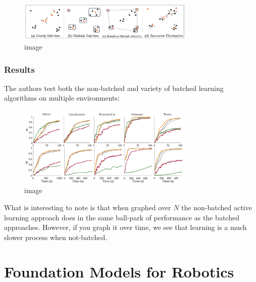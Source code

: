 \documentclass[
  letterpaper,
  DIV=11,
  numbers=noendperiod,
  oneside]{scrreprt}
\theoremstyle{remark}
\begin{document}
\begin{figure}[H]

{\centering \includegraphics[width=0.75\textwidth,height=\textheight]{src/Figures/greedy.png}

}

\caption{image}

\end{figure}%

\subsubsection{Results}\label{results}

The authors test both the non-batched and variety of batched learning
algorithms on multiple environments:

\begin{figure}[H]

{\centering \includegraphics[width=0.75\textwidth,height=\textheight]{src/Figures/activeresults.png}

}

\caption{image}

\end{figure}%

What is interesting to note is that when graphed over \(N\) the
non-batched active learning approach does in the same ball-park of
performance as the batched approaches. However, if you graph it over
time, we see that learning is a much slower process when not-batched.

\section{Foundation Models for
Robotics}\label{foundation-models-for-robotics}
\end{document}
